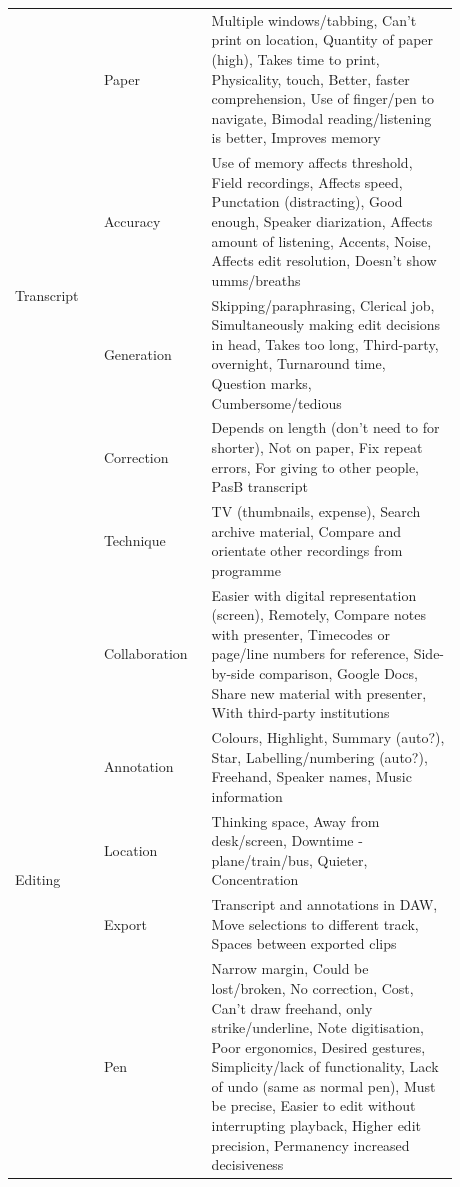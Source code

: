 \begin{table}[h]
\centering
{\small
\begin{tabular}{|p{0.18\linewidth}|p{0.2\linewidth}|p{0.5\linewidth}|}
\hline
\multirow{5}{*}{Transcript}
 & Paper & Multiple windows/tabbing, Can't print on location, Quantity of paper (high), Takes time to print, Physicality, touch, Better, faster comprehension, Use of finger/pen to navigate, Bimodal reading/listening is better, Improves memory \\ \cline{2-3}
 & Accuracy & Use of memory affects threshold, Field recordings, Affects speed, Punctation (distracting), Good enough, Speaker diarization, Affects amount of listening, Accents, Noise, Affects edit resolution, Doesn't show umms/breaths \\ \cline{2-3}
 & Generation & Skipping/paraphrasing, Clerical job, Simultaneously making edit decisions in head, Takes too long, Third-party, overnight, Turnaround time, Question marks, Cumbersome/tedious \\ \cline{2-3}
 & Correction & Depends on length (don't need to for shorter), Not on paper, Fix repeat errors, For giving to other people, PasB transcript \\ \cline{2-3}
 & Technique & TV (thumbnails, expense), Search archive material, Compare and orientate other recordings from programme \\ \hline
\multirow{8}{*}{Editing}
 & Collaboration & Easier with digital representation (screen), Remotely, Compare notes with presenter, Timecodes or page/line numbers for reference, Side-by-side comparison, Google Docs, Share new material with presenter, With third-party institutions \\ \cline{2-3}
 & Annotation & Colours, Highlight, Summary (auto?), Star, Labelling/numbering (auto?), Freehand, Speaker names, Music information \\ \cline{2-3}
 & Location & Thinking space, Away from desk/screen, Downtime - plane/train/bus, Quieter, Concentration \\ \cline{2-3}
 & Export & Transcript and annotations in DAW, Move selections to different track, Spaces between exported clips \\ \cline{2-3}
 & Pen & Narrow margin, Could be lost/broken, No correction, Cost, Can't draw freehand, only strike/underline, Note digitisation, Poor ergonomics, Desired gestures, Simplicity/lack of functionality, Lack of undo (same as normal pen), Must be precise, Easier to edit without interrupting playback, Higher edit precision, Permanency increased decisiveness \\ \cline{2-3}

\end{tabular}}
\end{table}
